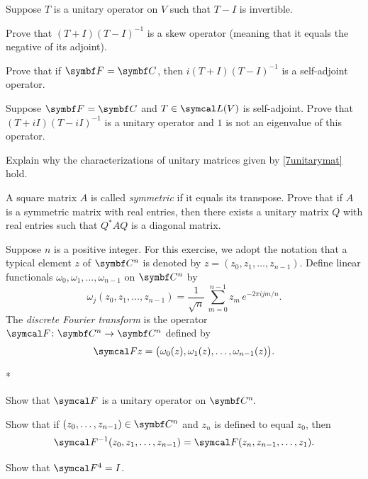 \begin{exercises}
\exercise
Suppose $T$ is a unitary operator on $V$ such that $T - I$ is invertible. \label{4UnitCircle}
\begin{subtheorem}
\item
Prove that $(T + I)(T - I)^{-1}$ is a skew operator (meaning that it equals the negative of its adjoint).
\item
Prove that if $\F{} = \C{}$, then $i (T + I)(T - I)^{-1}$ is a self-adjoint operator.
\end{subtheorem}


\exercise
Suppose $\F{} = \C{}$ and $T \in \L(V)$ is self-adjoint. Prove that $(T + iI)(T - iI)^{-1}$ is a unitary operator and $1$ is not an eigenvalue of this operator.


\exercise
Explain why the characterizations of unitary matrices given by \ref{7unitarymat} hold.


\exercise
A square matrix $A$ is called \textit{symmetric} if it equals its transpose. Prove that if $A$ is a symmetric matrix with real entries, then there exists a unitary matrix $Q$ with real entries such that $Q^* A Q$ is a diagonal matrix.


\exercise
Suppose $n$ is a positive integer. For this exercise, we adopt the notation that a typical element $z$ of $\C n$ is denoted by
$z = (z_0, z_1, \ldots, z_{n-1})$. Define linear functionals $\omega_0, \omega_1, \ldots, \omega_{n-1}$ on $\C n$ by
\[
\omega_j(z_0, z_1, \ldots, z_{n-1}) = \frac{1}{\sqrt{n}} \, \sum_{m=0}^{n-1} z_m \,e^{-2\pi i j m/n}.
\]
The \emph{discrete Fourier transform} is the operator $\fun \CF {\C n} {\C n}$ defined by
\[
\CF z = \paren[\big]{ \omega_0(z), \omega_1(z), \ldots, \omega_{n-1}(z) }.
\]
\begin{subtheorem}*
\item
Show that $\CF$ is a unitary operator on $\CC n$.
\item
Show that if $(z_0, \ldots, z_{n-1}) \in \C n$ and $z_n$ is defined to equal $z_0$, then
\[
\CF^{-1}(z_0, z_1, \ldots, z_{n-1}) = \CF(z_n, z_{n-1}, \ldots, z_1).
\]
\item
Show that $\CF^4 = I$.
\end{subtheorem}



\end{exercises}
